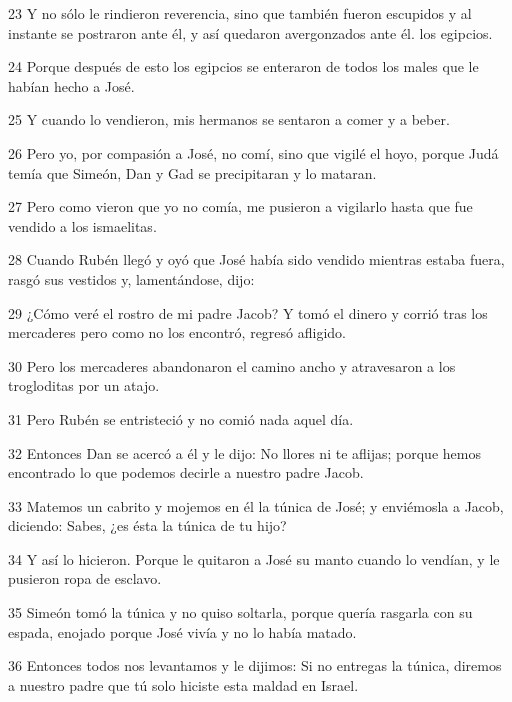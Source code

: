 \par 23 Y no sólo le rindieron reverencia, sino que también fueron escupidos y al instante se postraron ante él, y así quedaron avergonzados ante él. los egipcios.

\par 24 Porque después de esto los egipcios se enteraron de todos los males que le habían hecho a José.

\par 25 Y cuando lo vendieron, mis hermanos se sentaron a comer y a beber.

\par 26 Pero yo, por compasión a José, no comí, sino que vigilé el hoyo, porque Judá temía que Simeón, Dan y Gad se precipitaran y lo mataran.

\par 27 Pero como vieron que yo no comía, me pusieron a vigilarlo hasta que fue vendido a los ismaelitas.

\par 28 Cuando Rubén llegó y oyó que José había sido vendido mientras estaba fuera, rasgó sus vestidos y, lamentándose, dijo:

\par 29 ¿Cómo veré el rostro de mi padre Jacob? Y tomó el dinero y corrió tras los mercaderes pero como no los encontró, regresó afligido.

\par 30 Pero los mercaderes abandonaron el camino ancho y atravesaron a los trogloditas por un atajo.

\par 31 Pero Rubén se entristeció y no comió nada aquel día.

\par 32 Entonces Dan se acercó a él y le dijo: No llores ni te aflijas; porque hemos encontrado lo que podemos decirle a nuestro padre Jacob.

\par 33 Matemos un cabrito y mojemos en él la túnica de José; y enviémosla a Jacob, diciendo: Sabes, ¿es ésta la túnica de tu hijo?

\par 34 Y así lo hicieron. Porque le quitaron a José su manto cuando lo vendían, y le pusieron ropa de esclavo.

\par 35 Simeón tomó la túnica y no quiso soltarla, porque quería rasgarla con su espada, enojado porque José vivía y no lo había matado.

\par 36 Entonces todos nos levantamos y le dijimos: Si no entregas la túnica, diremos a nuestro padre que tú solo hiciste esta maldad en Israel.

